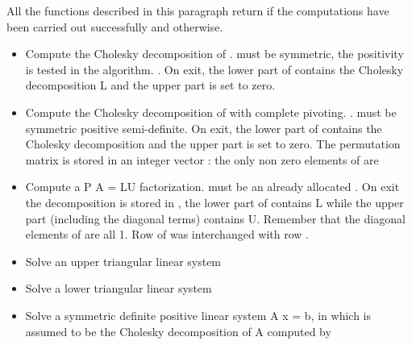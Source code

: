 All the functions described in this paragraph return  if the
computations have been carried out successfully and  otherwise.

\begin{itemize}
\item {}
  \sshortdescribe Compute the Cholesky decomposition of .  must
  be symmetric, the positivity is tested in the algorithm.  .
  On exit, the lower part of  contains the Cholesky decomposition L and
  the upper part is set to zero. 

\item {}
    \sshortdescribe Compute the
    Cholesky decomposition of  with complete pivoting. 
    .
     must be
    symmetric positive semi-definite. On exit, the lower part of 
    contains the Cholesky decomposition  and the upper part is set to zero. The
    permutation matrix is stored in an integer vector  : the only non
    zero elements of  are 

\item {} 
  \sshortdescribe Compute a P A = LU factorization.  must be an
  already allocated  . On exit the decomposition is
  stored in , the lower part of  contains L while the upper part
  (including the diagonal terms) contains U. Remember that the diagonal
  elements of  are all 1. Row  of  was interchanged with
  row .
  
\item {}
  \sshortdescribe Solve an upper triangular linear system 

\item {}
  \sshortdescribe Solve a lower triangular linear system  
  
\item {} 
  \sshortdescribe Solve a symmetric definite positive linear system A x = b, 
  in which  is assumed to be the Cholesky decomposition of A
  computed by 


\end{itemize}
